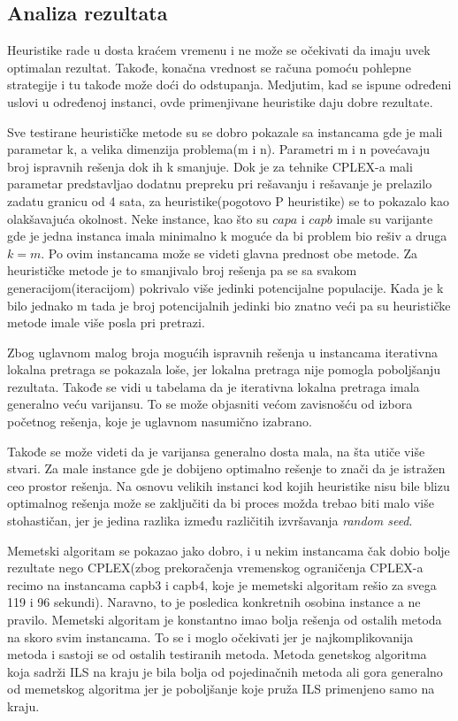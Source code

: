 \documentclass[a4paper]{article}
\begin{document}
\subsection{Analiza rezultata}

Heuristike rade u dosta kraćem vremenu i ne može se očekivati da imaju uvek optimalan rezultat. Takođe, konačna vrednost se računa pomoću pohlepne strategije i tu takođe može doći do odstupanja. Medjutim, kad se ispune određeni uslovi u određenoj instanci, ovde primenjivane heuristike daju dobre rezultate. 

Sve testirane heurističke metode su se dobro pokazale sa instancama gde je mali parametar k, a velika dimenzija problema(m i n). Parametri m i n povećavaju broj ispravnih rešenja dok ih k smanjuje. Dok je za tehnike CPLEX-a mali parametar predstavljao dodatnu prepreku pri rešavanju i rešavanje je prelazilo zadatu granicu od 4 sata, za heuristike(pogotovo P heuristike) se to pokazalo kao olakšavajuća okolnost. Neke instance, kao što su $capa$ i $capb$ imale su varijante gde je jedna instanca imala minimalno k moguće da bi problem bio rešiv a druga $k=m$. Po ovim instancama može se videti glavna prednost obe metode. Za heurističke metode je to smanjivalo broj rešenja pa se sa svakom generacijom(iteracijom) pokrivalo više jedinki potencijalne populacije. Kada je k bilo jednako m tada je broj potencijalnih jedinki bio znatno veći pa su heurističke metode imale više posla pri pretrazi. 

Zbog uglavnom malog broja mogućih ispravnih rešenja u instancama iterativna lokalna pretraga se pokazala loše, jer lokalna pretraga nije pomogla poboljšanju rezultata. Takođe se vidi u tabelama da je iterativna lokalna pretraga imala generalno veću varijansu. To se može objasniti većom zavisnošću od izbora početnog rešenja, koje je uglavnom nasumično izabrano.

Takođe se može videti da je varijansa generalno dosta mala, na šta utiče više stvari. Za male instance gde je dobijeno optimalno rešenje to znači da je istražen ceo prostor rešenja. Na osnovu velikih instanci kod kojih heuristike nisu bile blizu optimalnog rešenja može se zaključiti da bi proces možda trebao biti malo više stohastičan, jer je jedina razlika između različitih izvršavanja \emph{random seed}. 

Memetski algoritam se pokazao jako dobro, i u nekim instancama čak dobio bolje rezultate nego CPLEX(zbog prekoračenja vremenskog ograničenja CPLEX-a recimo na instancama capb3 i capb4, koje je memetski algoritam rešio za svega 119 i 96 sekundi). Naravno, to je posledica konkretnih osobina instance a ne pravilo. Memetski algoritam je konstantno imao bolja rešenja od ostalih metoda na skoro svim instancama. To se i moglo očekivati jer je najkomplikovanija metoda i sastoji se od ostalih testiranih metoda. Metoda genetskog algoritma koja sadrži ILS na kraju je bila bolja od pojedinačnih metoda ali gora generalno od memetskog algoritma jer je poboljšanje koje pruža ILS primenjeno samo na kraju.
\end{document}
